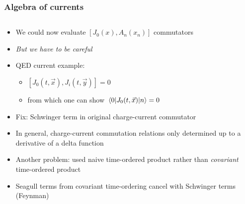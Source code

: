 \documentclass[accentcolor=tud2c,usenames,dvipsnames,colorbacktitle,inverttitle,landscape,german,presentation,t]{tudbeamer}
\begin{document}
  \begin{frame}
    \frametitle{Algebra of currents}
    \begin{columns}[c]
      \begin{column}{0.8\textwidth}
        \begin{itemize}
          \item We could now evaluate $[J_{0}(x), A_{n}(x_{n})]$ commutators
          \item \textit{But we have to be careful}
          \item QED current example:
          \begin{itemize}
            \item $[J_0(t, \vec{x}), J_{i}(t, \vec{y})] = 0$
            \item from which one can show $\mel*{0}{J_0(t, \vec{x})}{n} = 0$
          \end{itemize}
          \item Fix: Schwinger term in original charge-current commutator
          \item In general, charge-current commutation relations only determined up to a derivative of a delta function
          \item Another problem: used naive time-ordered product rather than \textit{covariant} time-ordered product
          \item Seagull terms from covariant time-ordering cancel with Schwinger terms (Feynman)
        \end{itemize}
      \end{column}
    \end{columns}
  \end{frame}
\end{document}
